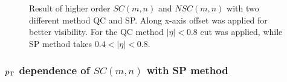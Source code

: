 	\begin{figure}[h]
		\begin{center}
        \caption{Result of higher order $SC(m,n)$ and $NSC(m,n)$ with two different method QC and SP. Along x-axis offset was applied for better visibility. For the QC method $|\eta| < 0.8$ cut was applied, while SP method takes $0.4 < |\eta| <0.8$.}
        \label{SC_higherorder_comparison}
        \end{center}   
     \end{figure}
     
     
\subsubsection{$p_{\rm{T}}$ dependence of $SC(m,n)$ with SP method}


